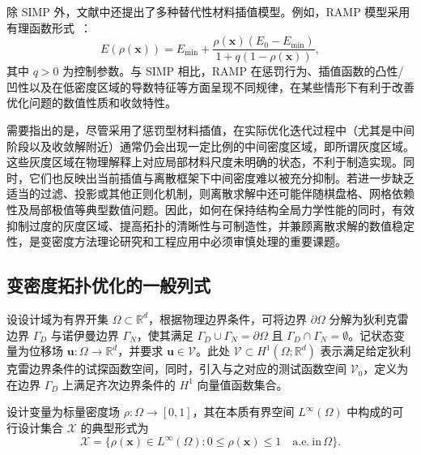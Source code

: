 除 SIMP 外，文献中还提出了多种替代性材料插值模型。例如，RAMP 模型采用有理函数形式~\cite{stolpeAlternativeInterpolationScheme2001a}：
\[
E(\rho(\boldsymbol{x})) = E_{\min} + \frac{\rho(\boldsymbol{x})(E_0-E_{\min})}{1+q(1-\rho(\boldsymbol{x}))},
\]
其中 $q>0$ 为控制参数。与 SIMP 相比，RAMP 在惩罚行为、插值函数的凸性/凹性以及在低密度区域的导数特征等方面呈现不同规律，在某些情形下有利于改善优化问题的数值性质和收敛特性。

需要指出的是，尽管采用了惩罚型材料插值，在实际优化迭代过程中（尤其是中间阶段以及收敛解附近）通常仍会出现一定比例的中间密度区域，即所谓灰度区域。这些灰度区域在物理解释上对应局部材料尺度未明确的状态，不利于制造实现。同时，它们也反映出当前插值与离散框架下中间密度难以被充分抑制。若进一步缺乏适当的过滤、投影或其他正则化机制，则离散求解中还可能伴随棋盘格、网格依赖性及局部极值等典型数值问题。因此，如何在保持结构全局力学性能的同时，有效抑制过度的灰度区域、提高拓扑的清晰性与可制造性，并兼顾离散求解的数值稳定性，是变密度方法理论研究和工程应用中必须审慎处理的重要课题。


\subsection{变密度拓扑优化的一般列式}
\label{subsec:general_formulation}

设设计域为有界开集 $\Omega\subset\mathbb{R}^d$，根据物理边界条件，可将边界 $\partial\Omega$ 分解为狄利克雷边界 $\Gamma_D$ 与诺伊曼边界 $\Gamma_N$，使其满足  $\Gamma_D \cup \Gamma_N = \partial\Omega$  且 $\Gamma_D \cap \Gamma_N = \emptyset$。记状态变量为位移场 $\boldsymbol{u}:\Omega\to\mathbb{R}^d$，并要求 $\boldsymbol{u} \in \mathcal{V}$。此处 $\mathcal{V} \subset H^1(\Omega;\mathbb{R}^d)$ 表示满足给定狄利克雷边界条件的试探函数空间，同时，引入与之对应的测试函数空间 $\mathcal{V}_0$，定义为在边界 $\Gamma_D$ 上满足齐次边界条件的 $H^1$ 向量值函数集合。

设计变量为标量密度场 $\rho:\Omega\to[0,1]$，其在本质有界空间 $L^\infty(\Omega)$ 中构成的可行设计集合 $\mathcal{X}$ 的典型形式为
\[
\mathcal{X} = \{\rho(\boldsymbol{x})\in{L}^\infty(\Omega):0\leq\rho(\boldsymbol{x})\le1\quad\text{a.e.}~\text{in}\,\Omega\}.
\]

